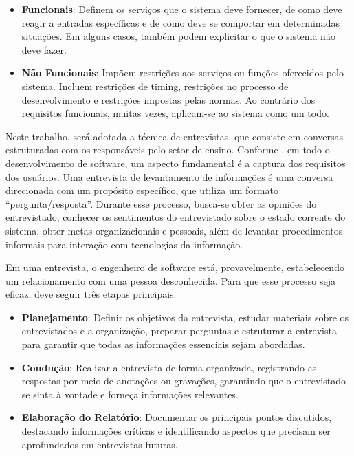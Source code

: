 \begin{itemize}
    \item \textbf{Funcionais}: Definem os serviços que o sistema deve fornecer, de como deve reagir a entradas específicas e de como deve se comportar em determinadas situações. Em alguns casos, também podem explicitar o que o sistema não deve fazer.
    \item \textbf{Não Funcionais}: Impõem restrições aos serviços ou funções oferecidos pelo sistema. Incluem restrições de timing, restrições no processo de desenvolvimento e restrições impostas pelas normas. Ao contrário dos requisitos funcionais, muitas vezes, aplicam-se ao sistema como um todo.
\end{itemize}

Neste trabalho, será adotada a técnica de entrevistas, que consiste em conversas estruturadas com os responsáveis pelo setor de ensino. Conforme , em todo o desenvolvimento de software, um aspecto fundamental é a captura dos requisitos dos usuários. Uma entrevista de levantamento de informações é uma conversa direcionada com um propósito específico, que utiliza um formato ``pergunta/resposta''. Durante esse processo, busca-se obter as opiniões do entrevistado, conhecer os sentimentos do entrevistado sobre o estado corrente do sistema, obter metas organizacionais e pessoais, além de levantar procedimentos informais para interação com tecnologias da informação.

Em uma entrevista, o engenheiro de software está, provavelmente, estabelecendo um relacionamento com uma pessoa desconhecida. Para que esse processo seja eficaz, deve seguir três etapas principais:

\begin{itemize}
    \item \textbf{Planejamento}: Definir os objetivos da entrevista, estudar materiais sobre os entrevistados e a organização, preparar perguntas e estruturar a entrevista para garantir que todas as informações essenciais sejam abordadas.
    \item \textbf{Condução}: Realizar a entrevista de forma organizada, registrando as respostas por meio de anotações ou gravações, garantindo que o entrevistado se sinta à vontade e forneça informações relevantes.
    \item \textbf{Elaboração do Relatório}: Documentar os principais pontos discutidos, destacando informações críticas e identificando aspectos que precisam ser aprofundados em entrevistas futuras.
\end{itemize}


